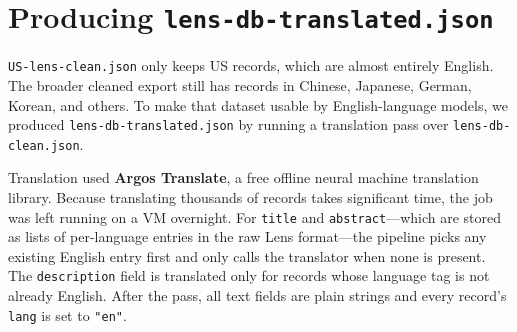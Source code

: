 \documentclass[11pt]{article}
\begin{document}
\section{Producing \texttt{lens-db-translated.json}}
\label{sec:translation}

\texttt{US-lens-clean.json} only keeps US records, which are almost entirely English.
The broader cleaned export still has records in Chinese, Japanese, German, Korean, and
others. To make that dataset usable by English-language models, we produced
\texttt{lens-db-translated.json} by running a translation pass over \texttt{lens-db-clean.json}.

Translation used \textbf{Argos Translate}, a free offline neural machine translation
library. Because translating thousands of records takes significant time, the job was left
running on a VM overnight. For \texttt{title} and \texttt{abstract}---which are stored as
lists of per-language entries in the raw Lens format---the pipeline picks any existing
English entry first and only calls the translator when none is present. The
\texttt{description} field is translated only for records whose language tag is not
already English. After the pass, all text fields are plain strings and every record's
\texttt{lang} is set to \texttt{"en"}.
\end{document}
